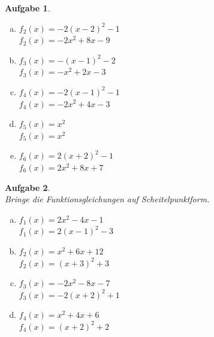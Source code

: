 \documentclass[12pt,fleqn]{article}
\theoremstyle{aufg}
\newtheorem{aufgabe}{Aufgabe}
\theoremstyle{bsp}
\begin{document}
\begin{flushleft}
\begin{aufgabe}
\begin{multicols}{3}
\begin{enumerate}[a)]
\item 
$f_2(x)=- 2 \left(x - 2\right)^{2} - 1$ \\ 
$f_2(x)=- 2 x^{2} + 8 x - 9$ \\ 

\item 
$f_3(x)=- \left(x - 1\right)^{2} - 2$ \\ 
$f_3(x)=- x^{2} + 2 x - 3$ \\ 

\item 
$f_4(x)=- 2 \left(x - 1\right)^{2} - 1$ \\ 
$f_4(x)=- 2 x^{2} + 4 x - 3$ \\ 

\item 
$f_5(x)=x^{2}$ \\ 
$f_5(x)=x^{2}$ \\ 

\item 
$f_6(x)=2 \left(x + 2\right)^{2} - 1$ \\ 
$f_6(x)=2 x^{2} + 8 x + 7$ \\ 

\end{enumerate} 
\end{multicols} 
\end{aufgabe} 
\begin{aufgabe} ~ \\ 
Bringe die Funktionsgleichungen auf Scheitelpunktform. \\ 
\begin{multicols}{3} 
\begin{enumerate}[a)] 
\item 
$f_1(x)=2 x^{2} - 4 x - 1$ \\ 
$f_1(x)=2 \left(x - 1\right)^{2} - 3$ \\ 

\item 
$f_2(x)=x^{2} + 6 x + 12$ \\ 
$f_2(x)=\left(x + 3\right)^{2} + 3$ \\ 

\item 
$f_3(x)=- 2 x^{2} - 8 x - 7$ \\ 
$f_3(x)=- 2 \left(x + 2\right)^{2} + 1$ \\ 

\item 
$f_4(x)=x^{2} + 4 x + 6$ \\ 
$f_4(x)=\left(x + 2\right)^{2} + 2$ \\ 


\end{enumerate}
\end{multicols}
\end{aufgabe}
\end{flushleft}
\end{document}

